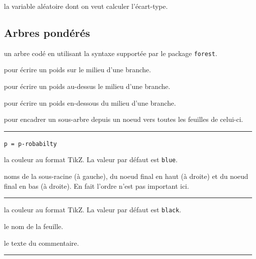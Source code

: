 \documentclass[12pt,a4paper]{book}
\theoremstyle{definition}
\newcommand\separation{
	\medskip
	\hfill\rule{0.5\textwidth}{0.75pt}\hfill
	\medskip
}
\newcommand\extraspace{
	\vspace{0.25em}
}
\newcommand\mwhyprefix[2]{%
	\texttt{#1 = #1-#2}%
}
\begin{document}
{{\IDarg{} la variable aléatoire dont on veut calculer l'écart-type.

















\subsection{Arbres pondérés}





\Content{} un arbre codé en utilisant la syntaxe supportée par le package \verb+forest+.

\extraspace

  pour écrire un poids sur le milieu d'une branche.

 pour écrire un poids au-dessus le milieu d'une branche.

 pour écrire un poids en-dessous du milieu d'une branche.

\extraspace

 pour encadrer un sous-arbre depuis un noeud vers toutes les feuilles de celui-ci.


\separation


 \hfill \mwhyprefix{p}{robabilty}

\IDoption{} la couleur au format TikZ. La valeur par défaut est \verb#blue#.

 noms de la sous-racine (à gauche), du noeud final en haut (à droite) et du noeud final en bas (à droite). En fait l'ordre n'est pas important ici.


\separation



\IDoption{} la couleur au format TikZ. La valeur par défaut est \verb#black#.

 le nom de la feuille.

 le texte du commentaire.


\separation




}}
\end{document}
